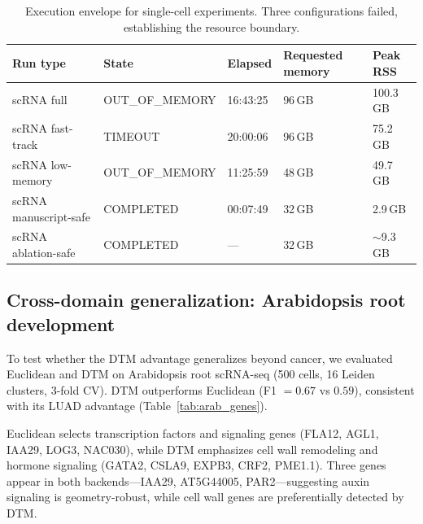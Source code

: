 \documentclass[12pt]{article}
\begin{document}
\begin{table}[h]
\centering
\small
\begin{tabular}{@{}lllll@{}}
\toprule
Run type & State & Elapsed & Requested memory & Peak RSS \\
\midrule
scRNA full & OUT\_OF\_MEMORY & 16:43:25 & 96\,GB & 100.3\,GB \\
scRNA fast-track & TIMEOUT & 20:00:06 & 96\,GB & 75.2\,GB \\
scRNA low-memory & OUT\_OF\_MEMORY & 11:25:59 & 48\,GB & 49.7\,GB \\
scRNA manuscript-safe & COMPLETED & 00:07:49 & 32\,GB & 2.9\,GB \\
scRNA ablation-safe & COMPLETED & --- & 32\,GB & ${\sim}$9.3\,GB \\
\bottomrule
\end{tabular}
\caption{Execution envelope for single-cell experiments. Three configurations failed, establishing the resource boundary.}
\label{tab:scRNAresource}
\end{table}

\subsection{Cross-domain generalization: Arabidopsis root development}
\label{sec:arabidopsis}

To test whether the DTM advantage generalizes beyond cancer, we evaluated Euclidean and DTM on Arabidopsis root scRNA-seq (500 cells, 16 Leiden clusters, 3-fold CV).
DTM outperforms Euclidean (F1 $= 0.67$ vs $0.59$), consistent with its LUAD advantage (Table~\ref{tab:arab_genes}).

Euclidean selects transcription factors and signaling genes (FLA12, AGL1, IAA29, LOG3, NAC030), while DTM emphasizes cell wall remodeling and hormone signaling (GATA2, CSLA9, EXPB3, CRF2, PME1.1).
Three genes appear in both backends---IAA29, AT5G44005, PAR2---suggesting auxin signaling is geometry-robust, while cell wall genes are preferentially detected by DTM.
\end{document}
